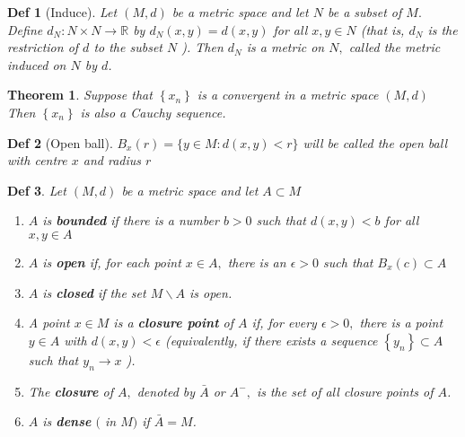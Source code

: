 \documentclass[10pt]{paper}
\newtheorem{theorem}{Theorem}[section]
\newtheorem{definition}{Def}[section]
\begin{document}
\begin{definition}[Induce]
    Let $(M, d)$ be a metric space and let $N$ be a subset of $M .$ Define $d_{N}: N \times N \rightarrow \mathbb{R}$ by $d_{N}(x, y)=d(x, y)$ for all $x, y \in N$ (that is, $d_{N}$ is the restriction of $d$ to the subset $N$ ). Then $d_{N}$ is a metric on $N,$ called the metric induced on $N$ by $d$.
\end{definition}

\begin{theorem}
    Suppose that $\left\{x_{n}\right\}$ is a convergent in a metric space $(M, d)$ Then $\left\{x_{n}\right\}$ is also a Cauchy sequence.
\end{theorem}

\begin{definition}[Open ball]
    $B_{x}(r)=\{y \in M: d(x, y)<r\}$ will be called the open ball with centre $x$ and radius $r$
\end{definition}

\begin{definition}
    Let $(M, d)$ be a metric space and let $A \subset M$
    \begin{enumerate}
        \item $A$ is \textbf{bounded} if there is a number $b>0$ such that $d(x, y)<b$ for all $x, y \in A$
        \item $A$ is \textbf{open} if, for each point $x \in A,$ there is an $\epsilon>0$ such that $B_{x}(c) \subset A$
        \item $A$ is \textbf{closed} if the set $M \backslash A$ is open.
        \item  A point $x \in M$ is a \textbf{closure point} of $A$ if, for every $\epsilon>0,$ there is a point $y \in A$ with $d(x, y)<\epsilon$ (equivalently, if there exists a sequence $\left\{y_{n}\right\} \subset A$ such that $y_{n} \rightarrow x$ ).
        \item  The \textbf{closure} of $A,$ denoted by $\bar{A}$ or $A^{-},$ is the set of all closure points of $A$.
        \item  $A$ is \textbf{dense} $($ in $M)$ if $\bar{A}=M$.
    \end{enumerate}
\end{definition}
\end{document}
